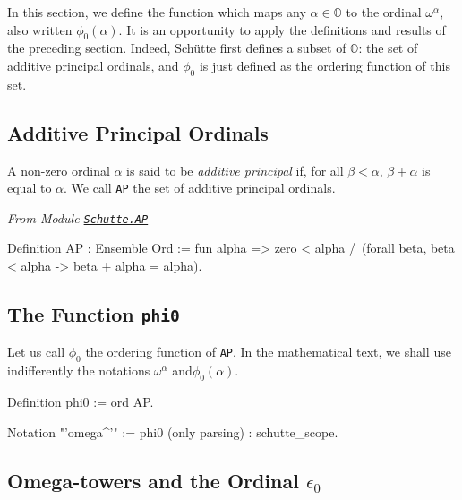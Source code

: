 {In this section, we define the function which maps any $\alpha\in\mathbb{O}$ to
the ordinal  $\omega^\alpha$, also written 
$\phi_0(\alpha)$. 
It is an opportunity to apply the definitions and results of the preceding section. 
Indeed,  Schütte first defines a subset of $\mathbb{O}$: the set of additive principal ordinals, and $\phi_0$  is just defined as the ordering function of this set.

\subsection{Additive Principal Ordinals}


\begin{definition}
A non-zero ordinal  $\alpha$ is said to be \emph{additive principal} if, for all  $\beta<\alpha$, $\beta+\alpha$ is equal to  $\alpha$.
We call \texttt{AP} the set of additive principal ordinals.

\end{definition}



\noindent\emph{From Module \href{../theories/html/hydras.Schutte.AP.html}%
{\texttt{Schutte.AP}}}

\begin{Coqsrc}
Definition AP : Ensemble Ord :=
  fun alpha => 
  zero < alpha /\
  (forall beta, beta < alpha ->  beta + alpha = alpha).
\end{Coqsrc}

\subsection{The Function \texttt{phi0}}

Let us call  $\phi_0$ the ordering function of \texttt{AP}.
In the mathematical text, we shall use indifferently the notations  $\omega^\alpha$ and$\phi_0(\alpha)$. 


\begin{Coqsrc}
Definition phi0 := ord AP.

Notation "'omega^'" := phi0 (only parsing) : schutte_scope.
\end{Coqsrc}

\subsection{Omega-towers and the Ordinal \texorpdfstring{$\epsilon_0$}{epsilon0}}


}
